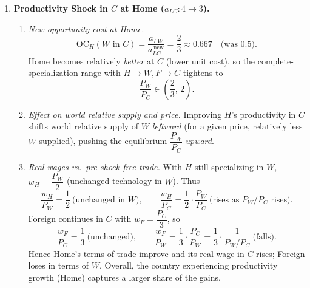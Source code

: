 \documentclass[11pt]{article}
\begin{document}
\begin{enumerate}[leftmargin=*, resume]
\begin{enumerate}
\item \emph{Equilibrium with $RD^{W/C}=1.1-0.2(P_W/P_C)$.}
Because $RD$ is continuous and decreasing, and $RS$ is a step function, the market clears either (i) on a step (if $RD$ hits a step value), or (ii) at a kink with the marginal country partially specialized. Evaluate $RD$ at kinks:
\[
RD(0.5)=1.1-0.2(0.5)=1.0,\quad RD(2/3)\approx 0.967,\quad RD(0.8)=0.94.
\]
All are \emph{below} the adjacent step value $1.875$. Hence equilibrium occurs at the \emph{lowest} kink $P_W/P_C=0.5$, with Country 1 splitting labor between $W$ and $C$ to make $RS=RD=1$.

Let $x\in[0,1]$ be the share of Country 1's labor in $W$ at $P=0.5$.
\[
W=\frac{100x}{1}=100x,
\qquad
C=\frac{100(1-x)}{2}+\frac{100}{3}+\frac{100}{5}=50(1-x)+53.\overline{3}=103.\overline{3}-50x.
\]
Set $W/C=1$:
\[
100x=103.\overline{3}-50x \ \Rightarrow\ 150x=103.\overline{3}\ \Rightarrow\ x\approx 0.6889.
\]
\emph{Production at equilibrium:} Country 1 uses $\approx 68.9\%$ of $L_1$ in $W$; Countries 2 and 3 produce only $C$.
\end{enumerate}

\item \textbf{Productivity Shock in $C$ at Home ($a_{LC}:4\to 3$).}

\begin{enumerate}
\item \emph{New opportunity cost at Home.}
\[
\text{OC}_H(W \text{ in } C)=\frac{a_{LW}}{a_{LC}^{\,\text{new}}}=\frac{2}{3}\approx 0.667
\quad\big(\text{was }0.5\big).
\]
Home becomes relatively \emph{better} at $C$ (lower unit cost), so the complete-specialization range with $H\to W, F\to C$ tightens to
\[
\frac{P_W}{P_C}\in\left(\frac{2}{3},\,2\right).
\]

\item \emph{Effect on world relative supply and price.} Improving $H$'s productivity in $C$ shifts world relative supply of $W$ \emph{leftward} (for a given price, relatively less $W$ supplied), pushing the equilibrium $\dfrac{P_W}{P_C}$ \emph{upward}.

\item \emph{Real wages vs.\ pre-shock free trade.} With $H$ still specializing in $W$, $w_H=\dfrac{P_W}{2}$ (unchanged technology in $W$). Thus
\[
\frac{w_H}{P_W}=\frac{1}{2}\ \text{(unchanged in $W$)},\qquad
\frac{w_H}{P_C}=\frac{1}{2}\cdot\frac{P_W}{P_C}\ \text{(rises as $P_W/P_C$ rises)}.
\]
Foreign continues in $C$ with $w_F=\dfrac{P_C}{3}$, so
\[
\frac{w_F}{P_C}=\frac{1}{3}\ \text{(unchanged)},\qquad
\frac{w_F}{P_W}=\frac{1}{3}\cdot\frac{P_C}{P_W}=\frac{1}{3}\cdot\frac{1}{P_W/P_C}\ \text{(falls)}.
\]
Hence Home's terms of trade improve and its real wage in $C$ rises; Foreign loses in terms of $W$. Overall, the country experiencing productivity growth (Home) captures a larger share of the gains.
\end{enumerate}
\end{enumerate}
\end{document}
